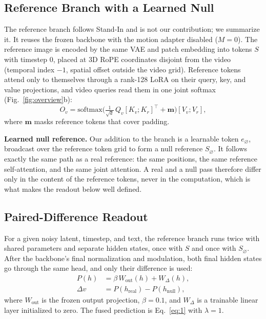 \subsection{Reference Branch with a Learned Null}
\label{sec:3_3}

The reference branch follows Stand-In \cite{xue2025standin} and is not our contribution; we summarize it. It reuses the frozen backbone with the motion adapter disabled ($M{=}0$). The reference image is encoded by the same VAE and patch embedding into tokens $S$ with timestep $0$, placed at 3D RoPE coordinates disjoint from the video (temporal index $-1$, spatial offset outside the video grid). Reference tokens attend only to themselves through a rank-128 LoRA on their query, key, and value projections, and video queries read them in one joint softmax (Fig.~\ref{fig:overview}b):
\begin{equation}\label{eq:3}
O_v = \mathrm{softmax}\!\Big(\tfrac{1}{\sqrt d}\,Q_v [K_v; K_r]^{\top} + \mathbf{m}\Big)[V_v; V_r],
\end{equation}
where $\mathbf{m}$ masks reference tokens that cover padding.

\textbf{Learned null reference.} Our addition to the branch is a learnable token $e_\varnothing$, broadcast over the reference token grid to form a null reference $S_\varnothing$. It follows exactly the same path as a real reference: the same positions, the same reference self-attention, and the same joint attention. A real and a null pass therefore differ only in the content of the reference tokens, never in the computation, which is what makes the readout below well defined.

\subsection{Paired-Difference Readout}
\label{sec:3_4}

For a given noisy latent, timestep, and text, the reference branch runs twice with shared parameters and separate hidden states, once with $S$ and once with $S_\varnothing$. After the backbone's final normalization and modulation, both final hidden states go through the same head, and only their difference is used:
\begin{equation}\label{eq:4}
\begin{aligned}
P(h) &= \beta\,W_{\mathrm{out}}(h) + W_{\Delta}(h),\\
\Delta v &= P(h_{\mathrm{real}}) - P(h_{\mathrm{null}}),
\end{aligned}
\end{equation}
where $W_{\mathrm{out}}$ is the frozen output projection, $\beta{=}0.1$, and $W_\Delta$ is a trainable linear layer initialized to zero. The fused prediction is Eq.~\eqref{eq:1} with $\lambda{=}1$.

